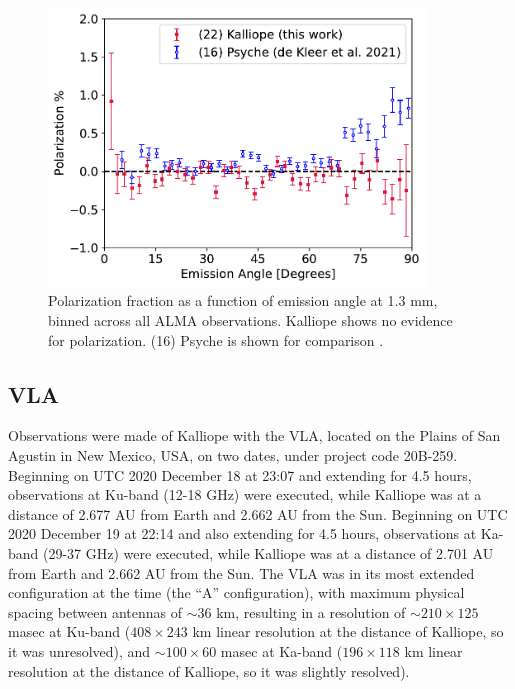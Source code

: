\documentclass[]{aastex631}
\begin{document}
\begin{figure}[ht!]
\centering
\includegraphics[width=10cm]{PolPercent.pdf}
\caption{Polarization fraction as a function of emission angle at 1.3 mm, binned across all ALMA observations. Kalliope shows no evidence for polarization. (16) Psyche is shown for comparison \citep[data from][]{dekleer2021}.}
\label{fig:polfrac} 
\end{figure}

\subsection{VLA} \label{sec:datavla}

Observations were made of Kalliope with the VLA, located on the Plains of San Agustin in New Mexico, USA, on two dates, under project code 20B-259.  Beginning on UTC 2020 December 18 at 23:07 and extending for 4.5 hours, observations at Ku-band (12-18 GHz) were executed, while Kalliope was at a distance of 2.677 AU from Earth and 2.662 AU from the Sun.  Beginning on UTC 2020 December 19 at 22:14 and also extending for 4.5 hours, observations at Ka-band (29-37 GHz) were executed, while Kalliope was at a distance of 2.701 AU from Earth and 2.662 AU from the Sun. The VLA was in its most extended configuration at the time (the ``A'' configuration), with maximum physical spacing between antennas of $\sim$36 km, resulting in a resolution of $\sim210\times125$ masec at Ku-band ($408\times243$ km linear resolution at the distance of Kalliope, so it was unresolved), and $\sim100\times60$ masec at Ka-band ($196\times118$ km linear resolution at the distance of  Kalliope, so it was slightly resolved).
\end{document}
